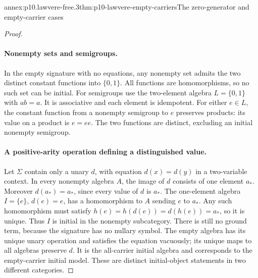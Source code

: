 \begin{annexitem}{annex:p10.lawvere-free.3}{thm:p10-lawvere-empty-carriers}{The zero-generator and empty-carrier cases}
\begin{proof}
\paragraph{Nonempty sets and semigroups.}
In the empty signature with no equations, any nonempty set admits
the two distinct constant functions into \(\{0,1\}\).
All functions are homomorphisms, so no such set can be initial.
For semigroups use the two-element algebra \(L=\{0,1\}\) with
\(a b=a\). It is associative and each element is idempotent.
For either \(e\in L\), the constant function from a nonempty
semigroup to \(e\) preserves products:
its value on a product is \(e=e e\).
The two functions are distinct, excluding an initial nonempty semigroup.

\paragraph{A positive-arity operation defining a distinguished value.}
Let \(\Sigma\) contain only a unary \(d\), with equation
\(d(x)=d(y)\) in a two-variable context.
In every nonempty algebra \(A\), the image of \(d\) consists of one
element \(a_*\). Moreover \(d(a_*)=a_*\), since every value of
\(d\) is \(a_*\).
The one-element algebra \(I=\{e\}\), \(d(e)=e\), has a homomorphism
to \(A\) sending \(e\) to \(a_*\).
Any such homomorphism must satisfy
\(h(e)=h(d(e))=d(h(e))=a_*\), so it is unique.
Thus \(I\) is initial in the nonempty subcategory.
There is still no ground term, because the signature has no nullary
symbol. The empty algebra has its unique unary operation and satisfies
the equation vacuously; its unique maps to all algebras preserve \(d\).
It is the all-carrier initial algebra and corresponds to the
empty-carrier initial model.  These are distinct initial-object
statements in two different categories.
\end{proof}
\end{annexitem}
